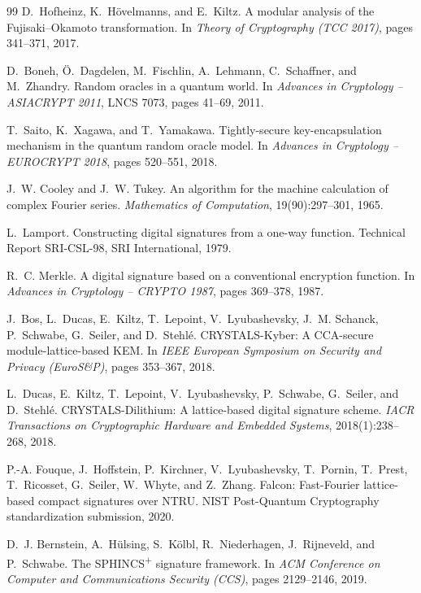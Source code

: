 \begin{thebibliography}{99}
 D.~Hofheinz, K.~H\"ovelmanns, and E.~Kiltz.
\newblock A modular analysis of the Fujisaki--Okamoto transformation.
\newblock In \emph{Theory of Cryptography (TCC 2017)}, pages 341--371, 2017.

 D.~Boneh, \"O.~Dagdelen, M.~Fischlin, A.~Lehmann, C.~Schaffner, and M.~Zhandry.
\newblock Random oracles in a quantum world.
\newblock In \emph{Advances in Cryptology -- ASIACRYPT 2011}, LNCS 7073, pages 41--69, 2011.

 T.~Saito, K.~Xagawa, and T.~Yamakawa.
\newblock Tightly-secure key-encapsulation mechanism in the quantum random oracle model.
\newblock In \emph{Advances in Cryptology -- EUROCRYPT 2018}, pages 520--551, 2018.

 J.~W. Cooley and J.~W. Tukey.
\newblock An algorithm for the machine calculation of complex Fourier series.
\newblock \emph{Mathematics of Computation}, 19(90):297--301, 1965.

 L.~Lamport.
\newblock Constructing digital signatures from a one-way function.
\newblock Technical Report SRI-CSL-98, SRI International, 1979.

 R.~C. Merkle.
\newblock A digital signature based on a conventional encryption function.
\newblock In \emph{Advances in Cryptology -- CRYPTO 1987}, pages 369--378, 1987.

 J.~Bos, L.~Ducas, E.~Kiltz, T.~Lepoint, V.~Lyubashevsky, J.~M. Schanck, P.~Schwabe, G.~Seiler, and D.~Stehl\'{e}.
\newblock CRYSTALS-Kyber: A CCA-secure module-lattice-based KEM.
\newblock In \emph{IEEE European Symposium on Security and Privacy (EuroS\&P)}, pages 353--367, 2018.

 L.~Ducas, E.~Kiltz, T.~Lepoint, V.~Lyubashevsky, P.~Schwabe, G.~Seiler, and D.~Stehl\'{e}.
\newblock CRYSTALS-Dilithium: A lattice-based digital signature scheme.
\newblock \emph{IACR Transactions on Cryptographic Hardware and Embedded Systems}, 2018(1):238--268, 2018.

 P.-A. Fouque, J.~Hoffstein, P.~Kirchner, V.~Lyubashevsky, T.~Pornin, T.~Prest, T.~Ricosset, G.~Seiler, W.~Whyte, and Z.~Zhang.
\newblock Falcon: Fast-Fourier lattice-based compact signatures over NTRU.
\newblock NIST Post-Quantum Cryptography standardization submission, 2020.

 D.~J. Bernstein, A.~H\"{u}lsing, S.~K\"{o}lbl, R.~Niederhagen, J.~Rijneveld, and P.~Schwabe.
\newblock The SPHINCS\textsuperscript{+} signature framework.
\newblock In \emph{ACM Conference on Computer and Communications Security (CCS)}, pages 2129--2146, 2019.


\end{thebibliography}
